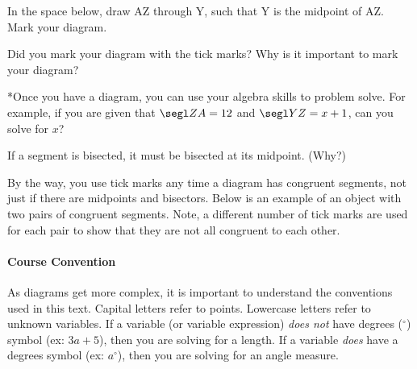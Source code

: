 \noindent \q In the space below, draw \seg AZ through \pnt Y, such that \pnt Y is the midpoint of \seg AZ.  Mark your diagram.

	\begin{center}
	\hspace*{4cm}
	\end{center}
\bigskip

\noindent \q Did you mark your diagram with the tick marks?  Why is it important to mark your diagram?
\medskip

\noindent **Once you have a diagram, you can use your algebra skills to problem solve.
\q For example,
if you are given that $\segl ZA =12$ and $\segl YZ=x+1$,
can you solve for $x$?
\bigskip

\noindent \q If a segment is bisected, it must be bisected at its midpoint. (Why?)
\medskip
\newpage

By the way, you use tick marks any time a diagram has congruent segments, not just if there are midpoints and bisectors.  Below is an example of an object with two pairs of congruent segments.  Note, a different number of tick marks are used for each pair to show that they are not all congruent to each other.

	\begin{center}
	\end{center}
	
\paragraph{Course Convention}	
As diagrams get more complex, it is important to understand the conventions used in this text.  Capital letters refer to points.  Lowercase letters refer to unknown variables.  If a variable (or variable expression) \emph{does not} have degrees ($^\circ$) symbol (ex: $3a+5$), then you are solving for a length.  If a variable \emph{does} have a degrees symbol (ex: $a^\circ$), then you are solving for an angle measure.

